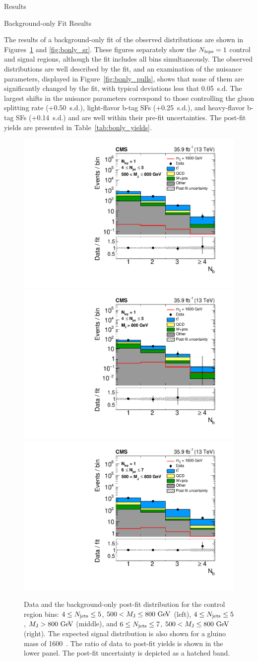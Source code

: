 \begin{section}{Results}

\begin{subsection}{Background-only Fit Results}

The results of a background-only fit of the observed \Nb distributions are shown in Figures~\ref{fig:bonly_cr} and \ref{fig:bonly_sr}.
These figures separately show the $N_{\mathrm{leps}} = 1$ control and signal regions, although the fit includes all bins simultaneously. 
The observed \Nb distributions are well described by the fit, and an examination of the nuisance parameters, displayed in Figure~\ref{fig:bonly_pulls}, shows that none of them are significantly changed by the fit, with typical deviations less that 0.05~s.d.
The largest shifts in the nuisance parameters correspond to those controlling the gluon splitting rate (+0.50~s.d.), light-flavor b-tag SFs (+0.25~s.d.), and heavy-flavor b-tag SFs (+0.14~s.d.) and are well within their pre-fit uncertainties.
The post-fit yields are presented in Table~\ref{tab:bonly_yields}.

\begin{figure}[tbp!]
\centering
\includegraphics[angle=0,width=0.32\columnwidth]{fig/bonly_nlep1_nj45_lowmj.pdf}
\includegraphics[angle=0,width=0.32\columnwidth]{fig/bonly_nlep1_nj45_highmj.pdf}
\includegraphics[angle=0,width=0.32\columnwidth]{fig/bonly_nlep1_nj67_lowmj.pdf}
\caption{Data and the background-only post-fit \Nb distribution for the control region bins: $4 \leq N_{\mathrm{jets}} \leq 5$, $500 < M_{\mathrm{J}} \leq 800~\mathrm{Ge\kern -0.1em V}$ (left), $4 \leq N_{\mathrm{jets}} \leq 5$, $M_{\mathrm{J}} > 800~\mathrm{Ge\kern -0.1em V}$ (middle), and $6 \leq N_{\mathrm{jets}} \leq 7$, $500 < M_{\mathrm{J}} \leq 800~\mathrm{Ge\kern -0.1em V}$ (right).
The expected signal distribution is also shown for a gluino mass of 1600~\GeV.
The ratio of data to post-fit yields is shown in the lower panel.
The post-fit uncertainty is depicted as a hatched band.}
\label{fig:bonly_cr}
\end{figure}


\end{subsection}
\end{section}
